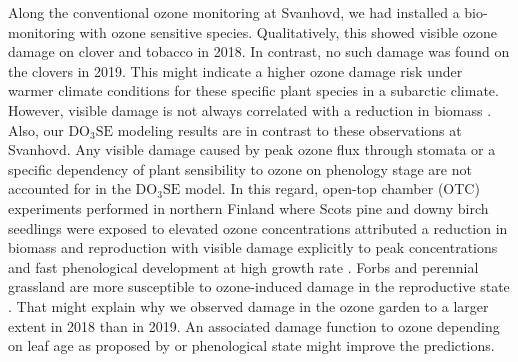 \documentclass[bg, manuscript]{copernicus}
\begin{document}
Along the conventional ozone monitoring at Svanhovd, we had installed a bio-monitoring with ozone sensitive species. Qualitatively, this showed visible ozone damage on clover and tobacco in 2018. In contrast, no such damage was found on the clovers in 2019. This might indicate a higher ozone damage risk under warmer climate conditions for these specific plant species in a subarctic climate. However, visible damage is not always correlated with a reduction in biomass \citep[and citations therein]{CRG:Felzer2007}. Also, our $\mathrm{DO_3SE}$ modeling results are in contrast to these observations at Svanhovd. Any visible damage caused by peak ozone flux through stomata or a specific dependency of plant sensibility to ozone on phenology stage are not accounted for in the $\mathrm{DO_3SE}$ model. In this regard, open-top chamber (OTC) experiments performed in northern Finland where Scots pine and downy birch seedlings were exposed to elevated ozone concentrations attributed a reduction in biomass and reproduction with visible damage explicitly to peak  concentrations and fast phenological development at high growth rate \citep{Amb:Manninen2009}. Forbs and perennial grassland are more susceptible to ozone-induced damage in the reproductive state \citep{EP:Bassin2004}. 
That might explain why we observed damage in the ozone garden to a larger extent in 2018 than in 2019. An associated damage function to ozone depending on leaf age as proposed by \citet{AE:Musselman2006} or phenological state might improve the predictions.
\end{document}
